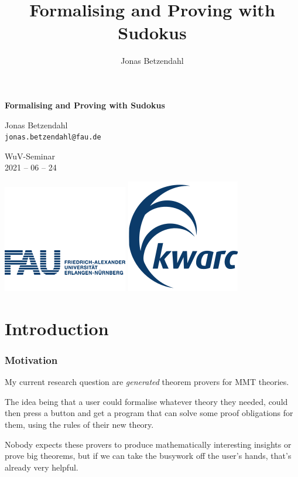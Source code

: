 \documentclass[aspectratio=169, usenames, dvipsnames]{beamer}
\author{Jonas Betzendahl}
\title{Formalising and Proving with Sudokus}
\newcommand{\MMT}{\textsf{MMT}\xspace}
\begin{document}
\begin{frame}
\begin{center}
\Large \textbf{Formalising and Proving with Sudokus}

\normalsize 
\bigskip\bigskip

\large Jonas Betzendahl\\
\texttt{jonas.betzendahl@fau.de}\bigskip

\small
WuV-Seminar\\
2021 -- 06 -- 24
\medskip

\includegraphics[scale=0.25]{images/fau_logo.png}
\quad
\includegraphics[scale=0.25]{images/kwarclogo_faublau.png} 
\end{center}
\end{frame}

\section{Introduction}

\begin{frame}
\frametitle{Motivation}

My current research question are \emph{generated} theorem provers for \MMT theories.
\bigskip

The idea being that a user could formalise whatever theory they needed, could then press a button and get a program that can solve some proof obligations for them, using the rules of their new theory.
\bigskip

Nobody expects these provers to produce mathematically interesting insights or prove big theorems, but
if we can take the busywork off the user's hands, that's already very helpful.
\end{frame}
\end{document}
